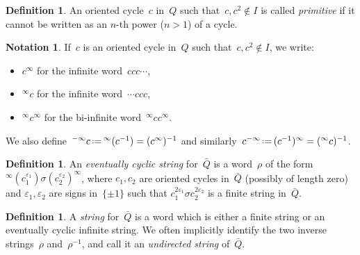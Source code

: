 \documentclass{amsart}
\theoremstyle{definition}
\newtheorem{definition}[theorem]{Definition}
\newtheorem{notation}[theorem]{Notation}
\newcommand{\set}[2]{\left\{ #1 \;\middle|\; #2 \right\}} %
\newcommand{\eqdef}{\mbox{\,\raisebox{0.2ex}{\scriptsize\ensuremath{\mathrm:}}\ensuremath{=}\,}} %
\newcommand{\darkblue}{\color{darkblue}} %
\newcommand{\defn}[1]{\textsl{\darkblue #1}} %
\begin{document}
\begin{definition}
 An oriented cycle~$c$ in~$Q$ such that~$c, c^2 \notin I$ is called \defn{primitive} if it cannot be written as an $n$-th power ($n>1$) of a cycle.
\end{definition}

\begin{notation}
If~$c$ is an oriented cycle in~$Q$ such that~$c, c^2 \notin I$, we write:
\begin{itemize}
\item $c^\infty$ for the infinite word~$c c c\cdots$,
\item ${}^\infty c$ for the infinite word~$\cdots c c c$,
\item $^\infty c^\infty$ for the bi-infinite word~$^\infty c c^\infty$.
\end{itemize}
We also define~${}^{-\infty}c \eqdef {}^{\infty}(c^{-1}) = (c^\infty)^{-1}$ and similarly~$c^{-\infty} \eqdef (c^{-1})^\infty = (^\infty c)^{-1}$.
\end{notation}


\begin{definition}
An \defn{eventually cyclic string} for~$\bar Q$ is a word~$\rho$ of the form~${}^\infty(c_1^{\varepsilon_1})\sigma (c_2^{\varepsilon_2})^\infty$, where $c_1, c_2$ are oriented cycles in~$\bar Q$ (possibly of length zero) and $\varepsilon_1, \varepsilon_2$ are signs in~$\{\pm 1\}$ such that $c_1^{2\varepsilon_1} \sigma c_2^{2\varepsilon_2}$ is a finite string in~$\bar Q$.
\end{definition}

\begin{definition}
A \defn{string} for~$\bar Q$ is a word which is either a finite string or an eventually cyclic infinite string.
We often implicitly identify the two inverse strings~$\rho$ and~$\rho^{-1}$, and call it an \defn{undirected string} of~$\bar Q$.
\end{definition}
\end{document}
